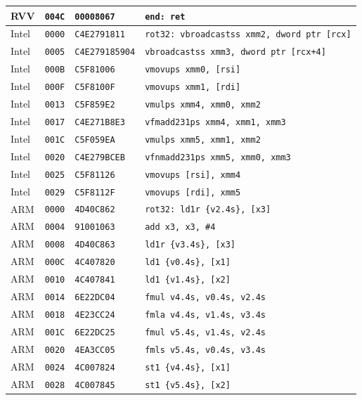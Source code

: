 \begin{table}[htbp]
\begin{tabular}{@{}l|l|l|p{7.2cm}@{}}
RVV & \texttt{004C} & \texttt{00008067} & \texttt{end: ret} \\
\midrule
Intel & \texttt{0000} & \texttt{C4E2791811} & \texttt{rot32: vbroadcastss xmm2, dword ptr [rcx]} \\
Intel & \texttt{0005} & \texttt{C4E279185904} & \texttt{vbroadcastss xmm3, dword ptr [rcx+4]} \\
Intel & \texttt{000B} & \texttt{C5F81006} & \texttt{vmovups xmm0, [rsi]} \\
Intel & \texttt{000F} & \texttt{C5F8100F} & \texttt{vmovups xmm1, [rdi]} \\
Intel & \texttt{0013} & \texttt{C5F859E2} & \texttt{vmulps xmm4, xmm0, xmm2} \\
Intel & \texttt{0017} & \texttt{C4E271B8E3} & \texttt{vfmadd231ps xmm4, xmm1, xmm3} \\
Intel & \texttt{001C} & \texttt{C5F059EA} & \texttt{vmulps xmm5, xmm1, xmm2} \\
Intel & \texttt{0020} & \texttt{C4E279BCEB} & \texttt{vfnmadd231ps xmm5, xmm0, xmm3} \\
Intel & \texttt{0025} & \texttt{C5F81126} & \texttt{vmovups [rsi], xmm4} \\
Intel & \texttt{0029} & \texttt{C5F8112F} & \texttt{vmovups [rdi], xmm5} \\
\midrule
ARM & \texttt{0000} & \texttt{4D40C862} & \texttt{rot32: ld1r \{v2.4s\}, [x3]} \\
ARM & \texttt{0004} & \texttt{91001063} & \texttt{add x3, x3, \#4} \\
ARM & \texttt{0008} & \texttt{4D40C863} & \texttt{ld1r \{v3.4s\}, [x3]} \\
ARM & \texttt{000C} & \texttt{4C407820} & \texttt{ld1 \{v0.4s\}, [x1]} \\
ARM & \texttt{0010} & \texttt{4C407841} & \texttt{ld1 \{v1.4s\}, [x2]} \\
ARM & \texttt{0014} & \texttt{6E22DC04} & \texttt{fmul v4.4s, v0.4s, v2.4s} \\
ARM & \texttt{0018} & \texttt{4E23CC24} & \texttt{fmla v4.4s, v1.4s, v3.4s} \\
ARM & \texttt{001C} & \texttt{6E22DC25} & \texttt{fmul v5.4s, v1.4s, v2.4s} \\
ARM & \texttt{0020} & \texttt{4EA3CC05} & \texttt{fmls v5.4s, v0.4s, v3.4s} \\
ARM & \texttt{0024} & \texttt{4C007824} & \texttt{st1 \{v4.4s\}, [x1]} \\
ARM & \texttt{0028} & \texttt{4C007845} & \texttt{st1 \{v5.4s\}, [x2]} \\
\bottomrule
\end{tabular}
\endgroup
\end{table}
\noindent{}\par
